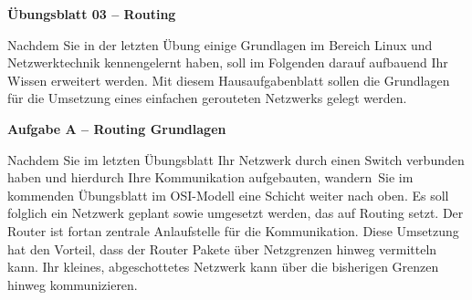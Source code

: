 \documentclass[paper=a4,fontsize=11pt]{scrartcl}%
\numberwithin{equation}{section}
\begin{document}
\begin{center}
\Large{\textbf{Übungsblatt 03 -- Routing}}\\
\end{center}
Nachdem Sie in der letzten Übung einige Grundlagen im Bereich Linux und Netzwerktechnik kennengelernt haben, soll im Folgenden darauf aufbauend Ihr Wissen erweitert werden. Mit diesem Hausaufgabenblatt sollen die Grundlagen für die Umsetzung eines einfachen gerouteten Netzwerks gelegt werden.\\
\begin{center}
\Large{\textbf{Aufgabe A -- Routing Grundlagen}}
\end{center}
\vskip0.25in
Nachdem Sie im letzten Übungsblatt Ihr Netzwerk durch einen Switch verbunden haben und hierdurch Ihre Kommunikation aufgebauten, \glqq wandern\grqq\ Sie im kommenden Übungsblatt im OSI-Modell eine Schicht weiter nach oben. Es soll folglich ein Netzwerk geplant sowie umgesetzt werden, das auf Routing setzt. Der Router ist fortan zentrale Anlaufstelle für die Kommunikation. Diese Umsetzung hat den Vorteil, dass der Router Pakete über Netzgrenzen hinweg vermitteln kann. Ihr kleines, abgeschottetes Netzwerk kann über die bisherigen Grenzen hinweg kommunizieren.
\end{document}
